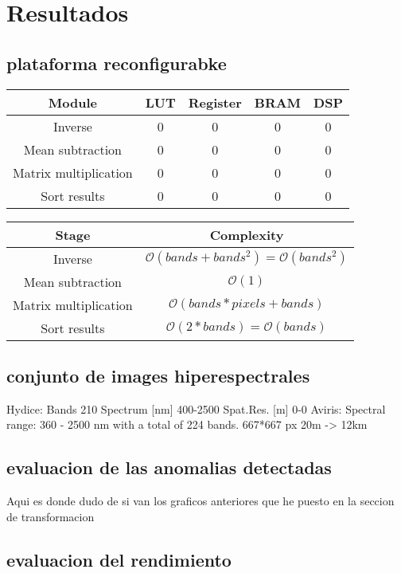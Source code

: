 \cleardoublepage
\chapter{Resultados}
\label{makereference}
\section{plataforma reconfigurabke}

\begin{center}
 \begin{tabular}{|c|c|c|c|c|} 
 \hline
 Module & LUT & Register & BRAM & DSP \\ [0.5ex] 
 \hline\hline
 Inverse & 0 & 0 & 0 & 0\\ 
 \hline
 Mean subtraction & 0 & 0 & 0 & 0\\ 
 \hline
 Matrix multiplication & 0 & 0 & 0 & 0\\ 
 \hline
 Sort results & 0 & 0 & 0 & 0\\ 
 \hline
\end{tabular}
\end{center}

\begin{center}
 \begin{tabular}{|c|c|} 
 \hline
 Stage & Complexity \\ [0.5ex] 
 \hline\hline
 Inverse & $\mathcal{O}(bands+bands^2) = \mathcal{O}(bands^2)$\\ 
 \hline
 Mean subtraction & $\mathcal{O}(1)$\\
 \hline
 Matrix multiplication & $\mathcal{O}(bands*pixels+bands)$\\
 \hline
 Sort results & $\mathcal{O}(2*bands) = \mathcal{O}(bands)$\\
 \hline
\end{tabular}
\end{center}

\section{conjunto de images hiperespectrales}

Hydice: Bands 	210
Spectrum [nm] 	400-2500
Spat.Res. [m] 	0-0 
Aviris:
Spectral range: 360 - 2500 nm with a total of 224 bands. 
667*667 px
20m -> 12km
\section{evaluacion de las anomalias detectadas}
Aqui es donde dudo de si van los graficos anteriores que he puesto en la seccion de transformacion
\section{evaluacion del rendimiento}